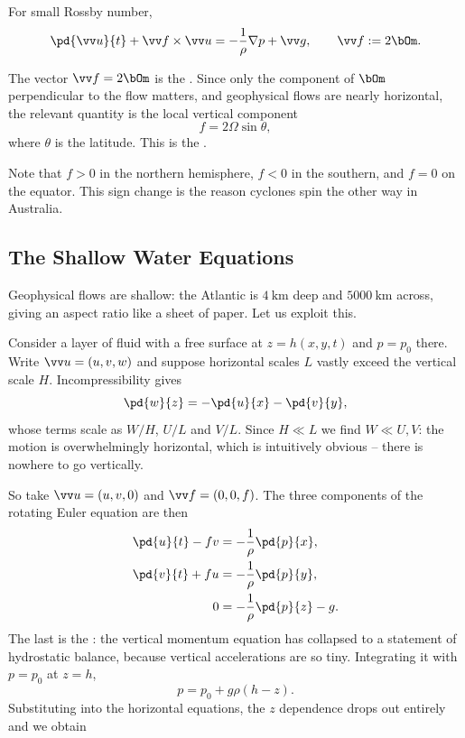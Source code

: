 \begin{proposition}
	For small Rossby number,
	$$
	\pd{\vv u}{t} + \vv f \times \vv u = -\frac{1}{\rho}\nabla p + \vv g, \qquad \vv f := 2\bOm.
	$$
\end{proposition}

\begin{definition}
	The vector $\vv f = 2\bOm$ is the . Since only the component of $\bOm$ perpendicular to the flow matters, and geophysical flows are nearly horizontal, the relevant quantity is the local vertical component
	$$
	f = 2\Omega\sin\theta,
	$$
	where $\theta$ is the latitude. This is the .
\end{definition}

Note that $f > 0$ in the northern hemisphere, $f < 0$ in the southern, and $f = 0$ on the equator. This sign change is the reason cyclones spin the other way in Australia.

\subsection{The Shallow Water Equations}

Geophysical flows are shallow: the Atlantic is $\SI{4}{\kilo\meter}$ deep and $\SI{5000}{\kilo\meter}$ across, giving an aspect ratio like a sheet of paper. Let us exploit this.

Consider a layer of fluid with a free surface at $z = h(x, y, t)$ and $p = p_0$ there. Write $\vv u = (u, v, w)$ and suppose horizontal scales $L$ vastly exceed the vertical scale $H$. Incompressibility gives
$$
\pd{w}{z} = -\pd{u}{x} - \pd{v}{y},
$$
whose terms scale as $W/H$, $U/L$ and $V/L$. Since $H \ll L$ we find $W \ll U, V$: the motion is overwhelmingly horizontal, which is intuitively obvious -- there is nowhere to go vertically.

So take $\vv u = (u, v, 0)$ and $\vv f = (0, 0, f)$. The three components of the rotating Euler equation are then
\begin{align*}
	\pd{u}{t} - fv &= -\frac{1}{\rho}\pd{p}{x}, \\
	\pd{v}{t} + fu &= -\frac{1}{\rho}\pd{p}{y}, \\
	0 &= -\frac{1}{\rho}\pd{p}{z} - g.
\end{align*}
The last is the : the vertical momentum equation has collapsed to a statement of hydrostatic balance, because vertical accelerations are so tiny. Integrating it with $p = p_0$ at $z = h$,
$$
p = p_0 + g\rho(h - z).
$$
Substituting into the horizontal equations, the $z$ dependence drops out entirely and we obtain

